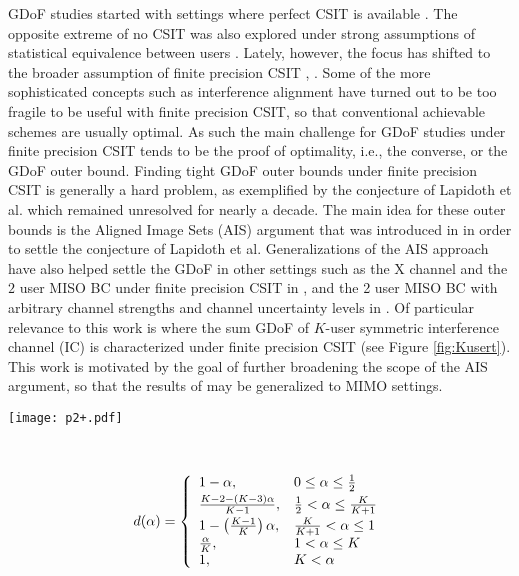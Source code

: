 \documentclass[11pt]{article}
\begin{document}
GDoF studies started with settings where perfect CSIT is available \cite{Etkin_Tse_Wang, Jafar_Vishwanath_GDOF, Karmakar_Varanasi}. The opposite extreme of no CSIT was also explored under strong assumptions of statistical equivalence between users \cite{Huang_Jafar_Shamai_Vishwanath, Varanasi_noCSIT, Guo_noCSIT}. Lately, however, the focus has shifted to the broader assumption of finite precision CSIT  \cite{Arash_Jafar_TC}, \cite{Arash_Bofeng_Jafar_BC}. Some of the more sophisticated concepts such as interference alignment \cite{Jafar_FnT} have turned out to be too fragile to be useful with finite precision CSIT, so that conventional achievable schemes are usually optimal. As such the  main challenge for GDoF studies under finite precision CSIT tends to be the proof of optimality, i.e., the converse, or the GDoF outer bound.  Finding tight GDoF outer bounds under finite precision CSIT is generally a hard problem, as exemplified by the conjecture of Lapidoth et al. \cite{Lapidoth_Shamai_Wigger_BC} which remained unresolved for nearly a decade. The main idea for these outer bounds is the Aligned Image Sets (AIS) argument that was introduced in  \cite{Arash_Jafar_PN} in order to settle the conjecture of Lapidoth et al. Generalizations of the AIS approach have also helped settle the GDoF in other settings such as the X channel and the $2$ user MISO BC under finite precision CSIT in \cite{Arash_Jafar_TC}, and the 2 user MISO BC with arbitrary channel strengths and channel uncertainty levels in \cite{Arash_Bofeng_Jafar_BC}. Of particular relevance to this work is  \cite{Arash_Jafar_IC} where the sum GDoF of $K$-user symmetric interference channel (IC) is characterized under finite precision CSIT (see Figure \ref{fig:Kusert}). This work is motivated by the goal of further broadening the scope of the AIS argument, so that the results of \cite{Arash_Jafar_IC} may be generalized to MIMO settings.

\begin{figure*}[h]
\center
\begin{minipage}[c]{0.54\textwidth}
	\centerline{\texttt{[image: p2+.pdf]}}
\end{minipage}~~~~~
\begin{minipage}[c]{0.33\textwidth}
\begin{eqnarray*}
d(\alpha) = \left\{
\begin{array}{ll} 
1-\alpha,&0\leq\alpha\leq \frac{1}{2}\vspace{0.03in}\\ 
\frac{K-2-(K-3)\alpha}{K-1}, &\frac{1}{2}<\alpha\leq\frac{K}{K+1}\vspace{0.03in}\\ 
1-\left(\frac{K-1}{K}\right)\alpha,&\frac{K}{K+1}<\alpha\leq 1\\
\frac{\alpha}{K},& 1<\alpha\leq K\\
1, &K<\alpha
\end{array}
\right.
\end{eqnarray*}
\end{minipage}
\caption{GDoF/user of the Symmetric $K$ User Interference Channel with Finite Precision CSIT \cite{Arash_Jafar_IC}.}\label{fig:Kusert}
\end{figure*}
\end{document}
